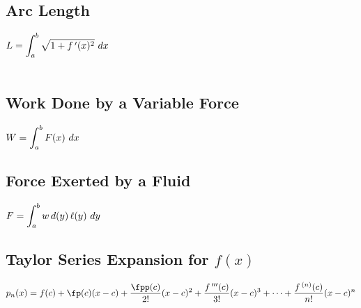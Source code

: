 \subsection*{Arc Length}

\noindent
$\ds L = \int_a^b{\sqrt{1+ f\,'(x)^2}}\ dx$\bigskip\\~


\noindent
\begin{minipage}[t]{.5\linewidth}
  \subsection*{Work Done by a Variable Force}
  $\displaystyle W = \int_a^b{F(x)}\ dx$
\end{minipage}%
\begin{minipage}[t]{.5\linewidth}
 \subsection*{Force Exerted by a Fluid}
 $\ds F = \int_a^b{w\,d(y)\,\ell(y)}\ dy$
\end{minipage}

\subsection*{Taylor Series Expansion for $f(x)$}
\noindent$\ds p_n(x) = f(c) + \fp(c)(x-c) + \frac{\fpp(c)}{2!}(x-c)^2 + \frac{f\,'''(c)}{3!}(x-c)^3 + \dotsb + \frac{f\,^{(n)}(c)}{n!}(x-c)^n$
\bigskip


